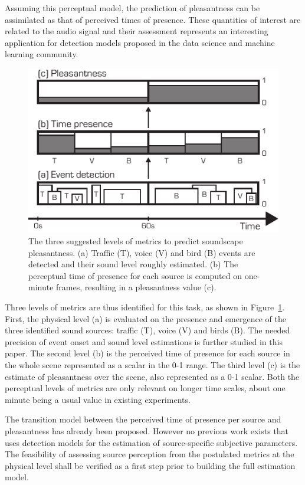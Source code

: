 \documentclass{article}
\begin{document}
\begin{sloppy}
Assuming this perceptual model, the prediction of pleasantness can be assimilated as that of perceived times of presence. These quantities of interest are related to the audio signal and their assessment represents an interesting application for detection models proposed in the data science and machine learning community.

\begin{figure}[t]
  \centering
  \centerline{\includegraphics[width=0.8\columnwidth]{block.pdf}}
  \caption{The three suggested levels of metrics to predict soundscape pleasantness. (a) Traffic (T), voice (V) and bird (B) events are detected and their sound level roughly estimated. (b) The perceptual time of presence for each source is computed on one-minute frames, resulting in a pleasantness value (c).}
  \label{fig:block}
\end{figure}

Three levels of metrics are thus identified for this task, as shown in Figure~\ref{fig:block}. First, the physical level (a) is evaluated on the presence and emergence of the three identified sound sources: traffic (T), voice (V) and birds (B). The needed precision of event onset and sound level estimations is further studied in this paper. The second level (b) is the perceived time of presence for each source in the whole scene represented as a scalar in the 0-1 range. The third level (c) is the estimate of pleasantness over the scene, also represented as a 0-1 scalar. Both the perceptual levels of metrics are only relevant on longer time scales, about one minute being a usual value in existing experiments.

The transition model between the perceived time of presence per source and pleasantness has already been proposed. However no previous work exists that uses detection models for the estimation of source-specific subjective parameters. The feasibility of assessing source perception from the postulated metrics at the physical level shall be verified as a first step prior to building the full estimation model.


\end{sloppy}
\end{document}
